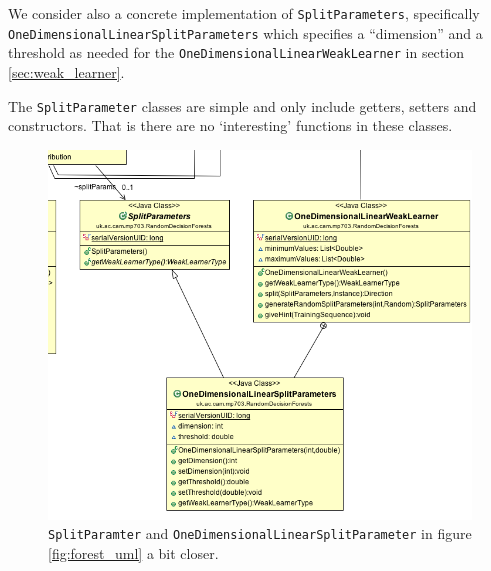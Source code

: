 \documentclass[12pt,twoside,notitlepage]{report}
\begin{document}
                We consider also a concrete implementation of \texttt{SplitParameters}, specifically 
                \texttt{OneDimensionalLinearSplitParameters} which specifies a ``dimension'' and a threshold as needed 
                for the \texttt{OneDimensionalLinearWeakLearner} in section \ref{sec:weak_learner}. 

                The \texttt{SplitParameter} classes are simple and only include getters, setters and constructors. That 
                is there are no `interesting' functions in these classes.

                \begin{figure}[H]
                    \centering
                    \includegraphics[scale=0.5]{SplitParam_Forest_UML}
                    \caption{\texttt{SplitParamter} and \texttt{OneDimensionalLinearSplitParameter} in figure 
                    \ref{fig:forest_uml} a bit closer.}
                    \label{fig:split_param_uml}
                \end{figure}
\end{document}
